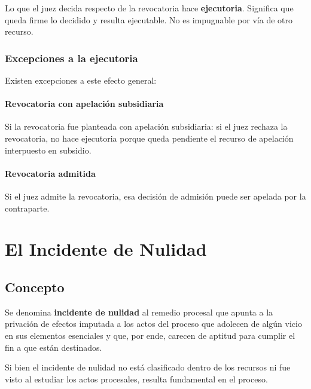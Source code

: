 \documentclass[12pt,oneside]{book}
\begin{document}
Lo que el juez decida respecto de la revocatoria hace \textbf{ejecutoria}. Significa que queda firme lo decidido y resulta ejecutable. No es impugnable por vía de otro recurso.

\subsection{Excepciones a la ejecutoria}

Existen excepciones a este efecto general:

\subsubsection{Revocatoria con apelación subsidiaria}

Si la revocatoria fue planteada con apelación subsidiaria: si el juez rechaza la revocatoria, no hace ejecutoria porque queda pendiente el recurso de apelación interpuesto en subsidio.

\subsubsection{Revocatoria admitida}

Si el juez admite la revocatoria, esa decisión de admisión puede ser apelada por la contraparte.


\chapter{El Incidente de Nulidad}

\section{Concepto}

Se denomina \textbf{incidente de nulidad} al remedio procesal que apunta a la privación de efectos imputada a los actos del proceso que adolecen de algún vicio en sus elementos esenciales y que, por ende, carecen de aptitud para cumplir el fin a que están destinados.

Si bien el incidente de nulidad no está clasificado dentro de los recursos ni fue visto al estudiar los actos procesales, resulta fundamental en el proceso.
\end{document}
